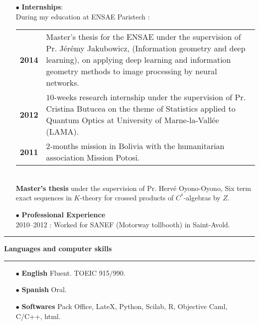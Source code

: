 \documentclass[a4paper,11pt]{article}
\newcommand{\titre}[1]{%
	\begin{center}
	\bigskip
	\rule{\textwidth}{1pt}
	\par\vspace{0.1cm}
        \textbf{\large #1}
	\par\rule{\textwidth}{1pt}
	\end{center}
	\bigskip
	}
\begin{document}
\begin{itemize}
\medskip
\item[$\bullet$] \textbf{Internships}: \\

During my education at ENSAE Paristech : \\

\begin{tabular}{cp{}}
\textbf{2014} & Master's thesis for the ENSAE under the supervision of Pr. Jérémy Jakubowicz, (Information geometry and deep learning), on applying deep learning and information geometry methods to image processing by neural networks.\\
\textbf{2012}&  $10$-weeks research internship under the supervision of Pr. Cristina Butucea on the theme of Statistics applied to Quantum Optics at University of Marne-la-Vallée (LAMA).		\\
\textbf{2011} & $2$-months mission in Bolivia with the humanitarian association Mission Potosi.\\
\end{tabular}
\\

\textbf{Master's thesis} under the supervision of Pr. Hervé Oyono-Oyono, Six term exact sequences in $K$-theory for crossed products of $C^*$-algebras by $Z$.

\medskip

\item[$\bullet$] \textbf{Professional Experience}\\ 2010--2012 : Worked for SANEF (Motorway tollbooth) in Saint-Avold.\\

\medskip
\end{itemize}

\titre{Languages and computer skills}

\begin{itemize} 
\medskip
\item[$\bullet$] \textbf{English} Fluent. TOEIC 915/990.
\medskip
\item[$\bullet$] \textbf{Spanish} Oral.
\medskip
\item[$\bullet$] \textbf{Softwares} Pack Office, LateX, Python, Scilab, R, Objective Caml, C/C++, html.
\end{itemize}
\end{document}
